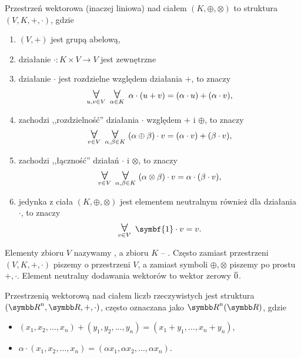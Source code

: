 \begin{definition}
    \label{d:vector_space}
    Przestrzeń wektorowa (inaczej liniowa) nad ciałem $(K, \oplus, \otimes)$ to struktura $(V, K, +, \cdot)$, gdzie
    \begin{enumerate}
        \item $(V, +)$ jest grupą abelową,
        \item działanie $\cdot : K \times V \to V$ jest zewnętrzne
        \item działanie $\cdot$ jest rozdzielne względem działania $+$, to znaczy
            \[ \dforall{u, v \in V} \dforall{\alpha \in K} \alpha\cdot(u + v) = (\alpha \cdot u) + (\alpha \cdot v), \]
        \item zachodzi ,,rozdzielność'' działania $\cdot$ względem $+$ i $\oplus$, to znaczy
            \[ \dforall{v \in V} \dforall{\alpha, \beta \in K} (\alpha \oplus \beta) \cdot v = (\alpha \cdot v) + (\beta \cdot v), \]
        \item zachodzi ,,łączność'' działań $\cdot$ i $\otimes$, to znaczy
            \[ \dforall{v \in V} \dforall{\alpha, \beta \in K} (\alpha \otimes \beta) \cdot v = \alpha \cdot (\beta \cdot v), \]
        \item jedynka z ciała $(K, \oplus, \otimes)$ jest elementem neutralnym również dla działania $\cdot$, to znaczy
            \[ \dforall{v \in V} \symbf{1} \cdot v = v. \]
    \end{enumerate}
\end{definition}

Elementy zbioru $V$ nazywamy , a zbioru $K$ -- . Często zamiast przestrzeni $(V, K, +, \cdot)$ piszemy o przestrzeni $V$, a zamiast symboli $\oplus, \otimes$ piszemy po prostu $+, \cdot$. Element neutralny dodawania wektorów to wektor zerowy $\overline{0}$.

\begin{example}
    Przestrzenią wektorową nad ciałem liczb rzeczywistych jest struktura $(\RR^n, \RR, +, \cdot)$, często oznaczana jako $\RR^n(\RR)$, gdzie
    \begin{itemize}[noitemsep,nolistsep]
        \item $(x_1, x_2, \ldots, x_n) + (y_1, y_2, \ldots, y_n) = (x_1 + y_1, \ldots, x_n + y_n)$,
        \item $\alpha \cdot (x_1, x_2, \ldots, x_n) = (\alpha x_1, \alpha x_2, \ldots, \alpha x_n)$.
    \end{itemize}
\end{example}

